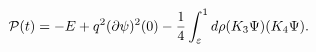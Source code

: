 \begin{equation}
{\cal P}(t)=-E+q^2 (\partial  \psi)^2(0)-
\frac14\int_{\varepsilon}^{1} d\rho (K_3 \Psi)(K_4 \Psi).
\end{equation}

